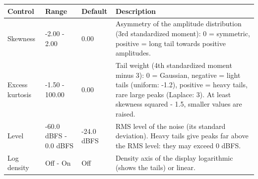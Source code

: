\begin{tabular}{p{}p{}p{}p{}}
\hline
Control & Range & Default & Description \\
\hline
Skewness & -2.00 - 2.00 & 0.00 & Asymmetry of the amplitude distribution (3rd standardized moment): 0 = symmetric, positive = long tail towards positive amplitudes. \\
Excess kurtosis & -1.50 - 100.00 & 0.00 & Tail weight (4th standardized moment minus 3): 0 = Gaussian, negative = light tails (uniform: -1.2), positive = heavy tails, rare large peaks (Laplace: 3). At least skewness squared - 1.5, smaller values are raised. \\
Level & -60.0 dBFS - 0.0 dBFS & -24.0 dBFS & RMS level of the noise (its standard deviation). Heavy tails give peaks far above the RMS level: they may exceed 0 dBFS. \\
Log density & Off - On & Off & Density axis of the display logarithmic (shows the tails) or linear. \\
\hline
\end{tabular}
